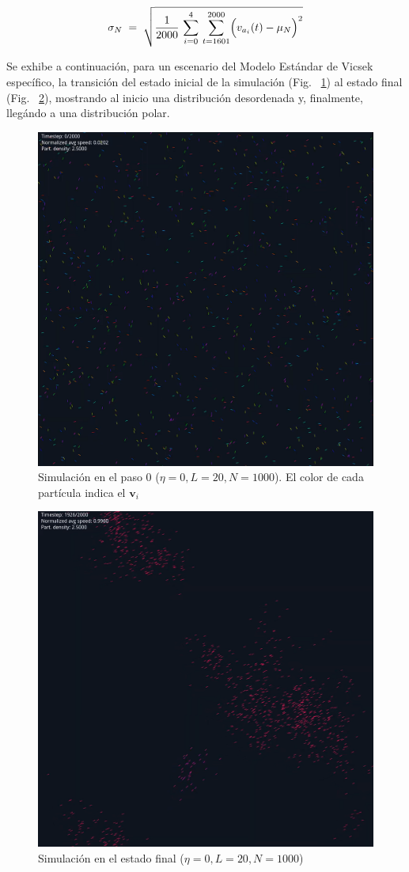 \documentclass{article}
\begin{document}
\[
\sigma_{N} \;=\; \sqrt{\frac{1}{2000}\,\sum_{i=0}^{4}\,\sum_{t=1601}^{2000}\Bigl(v_{a_i}(t)-\mu_{N}\Bigr)^2}
\]



Se exhibe a continuación, para un escenario del Modelo Estándar de Vicsek específico, la transición del estado inicial de la simulación (Fig. ~\ref{fig:1}) al estado final (Fig. ~\ref{fig:2}), mostrando al inicio una distribución desordenada y, finalmente, llegándo a una distribución polar.
\begin{figure}[H]
    \centering
    \includegraphics[width=0.75\linewidth]{simulation_example_t0.png}
    \caption{Simulación en el paso 0 (\(\eta=0, L=20, N=1000\)). El color de cada partícula indica el \(\mathbf v_i\)}
    \label{fig:1}
\end{figure}

\begin{figure}[H]
    \centering    \includegraphics[width=0.75\linewidth]{animation_example.png}
    \caption{Simulación en el estado final (\(\eta=0, L=20, N=1000\))}
    \label{fig:2}
\end{figure}
\end{document}

